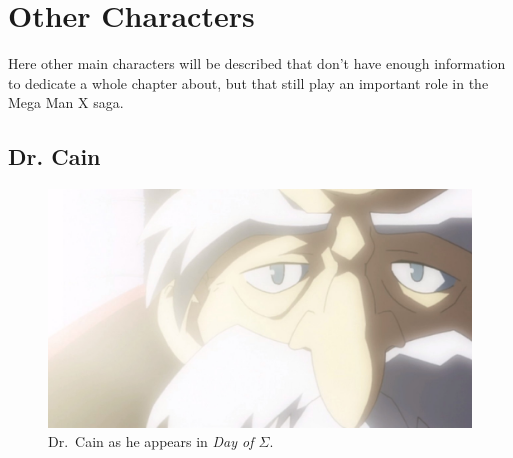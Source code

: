\chapter{Other Characters}
Here other main characters will be described that don't have enough information to dedicate a whole chapter
about, but that still play an important role in the Mega Man X saga.

\section{Dr. Cain} \label{char:Cain}

\begin{figure}[h]
	\centering
	\includegraphics[width=0.5\linewidth]{figures/Characters/Char_Cain_MHX.jpg}
	\caption{Dr.~Cain as he appears in \emph{Day of $\Sigma$}.}
\end{figure}


